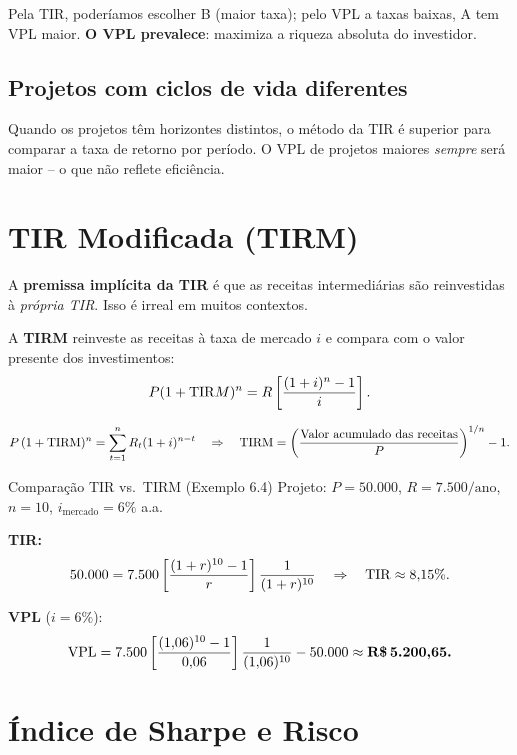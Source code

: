 Pela TIR, poderíamos escolher B (maior taxa); pelo VPL a taxas baixas, A tem VPL maior.
\textbf{O VPL prevalece}: maximiza a riqueza absoluta do investidor.

\subsection{Projetos com ciclos de vida diferentes}

Quando os projetos têm horizontes distintos, o método da TIR é superior para comparar
a taxa de retorno por período. O VPL de projetos maiores \emph{sempre} será maior --
o que não reflete eficiência.

\section{TIR Modificada (TIRM)}

A \textbf{premissa implícita da TIR} é que as receitas intermediárias são reinvestidas
à \emph{própria TIR}. Isso é irreal em muitos contextos.

\begin{definicao}
A \textbf{TIRM} reinveste as receitas à taxa de mercado $i$ e compara com o valor
presente dos investimentos:
\[
  P(1+\mathrm{TIR} M)^n = R\left[\frac{(1+i)^n-1}{i}\right].
\]
\end{definicao}

\begin{resultado}
\[
  P\,(1+\mathrm{TIRM})^n = \sum_{t=1}^n R_t(1+i)^{n-t}
  \quad\Rightarrow\quad
  \mathrm{TIRM} = \left(\frac{\text{Valor acumulado das receitas}}{P}\right)^{1/n} - 1.
\]
\end{resultado}

\begin{exemplo}{Comparação TIR vs.\ TIRM (Exemplo 6.4)}
Projeto: $P = 50{.}000$, $R = 7{.}500/\text{ano}$, $n = 10$, $i_{\text{mercado}} = 6\%$ a.a.

\medskip
\textbf{TIR:}
\[
  50{.}000 = 7{.}500\left[\frac{(1+r)^{10}-1}{r}\right]\frac{1}{(1+r)^{10}}
  \quad\Rightarrow\quad \mathrm{TIR} \approx 8{,}15\%.
\]

\textbf{VPL} ($i = 6\%$):
\[
  \mathrm{VPL} = 7{.}500\left[\frac{(1{,}06)^{10}-1}{0{,}06}\right]\frac{1}{(1{,}06)^{10}} - 50{.}000
       \approx \textbf{R\$\,5.200{,}65.}
\]
\end{exemplo}

\section{Índice de Sharpe e Risco}

